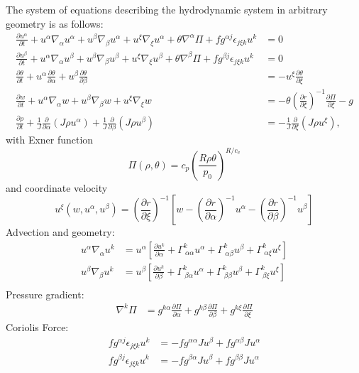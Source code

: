 \documentclass{article}
\newcommand{\pdiff}[2]{\frac{\partial #1}{\partial #2}}
\begin{document}
The system of equations describing the hydrodynamic system in arbitrary geometry is as follows:
\begin{align}
\pdiff{u^\alpha}{t} + u^\alpha \nabla_\alpha u^\alpha + u^\beta \nabla_\beta u^\alpha + u^\xi \nabla_\xi u^\alpha + \theta \nabla^\alpha \Pi + f g^{\alpha j} \epsilon_{j \xi k} u^k &= 0 \\
\pdiff{u^\beta}{t} + u^\alpha \nabla_\alpha u^\beta + u^\beta \nabla_\beta u^\beta + u^\xi \nabla_\xi u^\beta + \theta \nabla^\beta \Pi + f g^{\beta j} \epsilon_{j \xi k} u^k &= 0 \\
\pdiff{\theta}{t} + u^\alpha \pdiff{\theta}{\alpha} + u^\beta \pdiff{\theta}{\beta} &= - u^\xi \pdiff{\theta}{\xi} \\
\pdiff{w}{t} + u^\alpha \nabla_\alpha w + u^\beta \nabla_\beta w + u^\xi \nabla_\xi w &= - \theta \left( \pdiff{r}{\xi} \right)^{-1} \pdiff{\Pi}{\xi} - g \\
\pdiff{\rho}{t} + \frac{1}{J} \pdiff{}{\alpha} (J \rho u^\alpha) + \frac{1}{J} \pdiff{}{\beta} (J \rho u^\beta) &= - \frac{1}{J} \pdiff{}{\xi} (J \rho u^\xi),
\end{align} with Exner function
\begin{equation}
\Pi(\rho, \theta) = c_p \left( \frac{R \rho \theta}{p_0} \right)^{R/c_v}
\end{equation} and coordinate velocity
\begin{equation}
u^\xi(w, u^\alpha, u^\beta) = \left( \pdiff{r}{\xi} \right)^{-1} \left[w - \left( \pdiff{r}{\alpha} \right)^{-1} u^\alpha - \left( \pdiff{r}{\beta} \right)^{-1} u^\beta \right]
\end{equation}
Advection and geometry:
\begin{align}
u^\alpha \nabla_\alpha u^k &= u^\alpha \left[ \pdiff{u^k}{\alpha} + \Gamma^k_{\ \alpha \alpha} u^\alpha + \Gamma^k_{\ \alpha \beta} u^\beta + \Gamma^k_{\ \alpha \xi} u^\xi \right] \\
u^\beta \nabla_\beta u^k &= u^\beta \left[ \pdiff{u^k}{\beta} + \Gamma^k_{\ \beta \alpha} u^\alpha + \Gamma^k_{\ \beta \beta} u^\beta + \Gamma^k_{\ \beta \xi} u^\xi \right] \\
\end{align}
Pressure gradient:
\begin{align}
\nabla^k \Pi &= g^{k \alpha} \pdiff{\Pi}{\alpha} + g^{k \beta} \pdiff{\Pi}{\beta} + g^{k \xi} \pdiff{\Pi}{\xi}
\end{align}
Coriolis Force:
\begin{align}
f g^{\alpha j} \epsilon_{j \xi k} u^k &= - f g^{\alpha \alpha} J u^\beta + f g^{\alpha \beta} J u^\alpha \\
f g^{\beta j} \epsilon_{j \xi k} u^k &= - f g^{\beta \alpha} J u^\beta + f g^{\beta \beta} J u^\alpha
\end{align}
\end{document}
